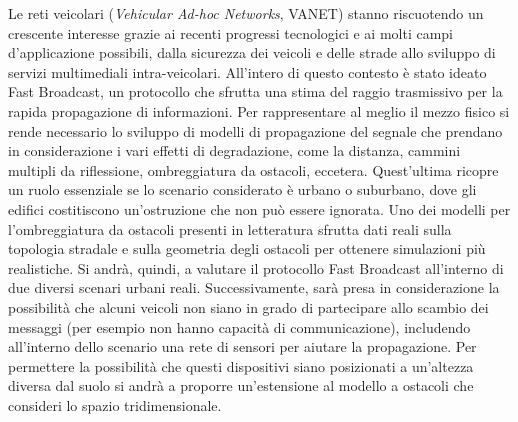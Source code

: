 
Le reti veicolari (\textit{Vehicular Ad-hoc Networks}, VANET) stanno riscuotendo un crescente interesse
grazie ai recenti progressi tecnologici e ai molti campi d'applicazione possibili, dalla sicurezza dei veicoli
e delle strade allo sviluppo di servizi multimediali intra-veicolari.
All'intero di questo contesto è stato ideato Fast Broadcast,
un protocollo che sfrutta una stima del raggio trasmissivo per la rapida propagazione di informazioni.
Per rappresentare al meglio il mezzo fisico si rende necessario lo sviluppo di modelli di propagazione del segnale
che prendano in considerazione i vari effetti di degradazione, come la distanza, cammini multipli da riflessione, ombreggiatura da ostacoli, eccetera.
Quest'ultima ricopre un ruolo essenziale se lo scenario considerato è urbano o suburbano,
dove gli edifici costitiscono un'ostruzione che non può essere ignorata.
Uno dei modelli per l'ombreggiatura da ostacoli presenti in letteratura
sfrutta dati reali sulla topologia stradale e sulla geometria degli ostacoli per ottenere simulazioni più realistiche.
Si andrà, quindi, a valutare il protocollo Fast Broadcast all'interno di due diversi scenari urbani reali.
Successivamente, sarà presa in considerazione la possibilità che alcuni veicoli non siano in grado
di partecipare allo scambio dei messaggi (per esempio non hanno capacità di communicazione), includendo all'interno dello scenario
una rete di sensori per aiutare la propagazione.
Per permettere la possibilità che questi dispositivi siano posizionati a un'altezza diversa dal suolo
si andrà a proporre un'estensione al modello a ostacoli che consideri lo spazio tridimensionale.

